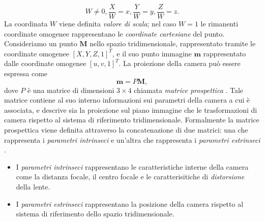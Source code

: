 \[W\neq 0,
\frac{X}{W}=x,
\frac{Y}{W}=y,
\frac{Z}{W}=z.\]
La coordinata $W$ viene definita \textit{valore di scala}; nel caso $W=1$ le rimanenti coordinate omogenee rappresentano le \textit{coordinate cartesiane} del punto.\\
Consideriamo un punto $\textbf{M}$ nello spazio tridimensionale, rappresentato tramite le coordinate omogenee $[X,Y,Z,1]^\textit{T}$, e il suo punto immagine $\textbf{m}$ rappresentato dalle coordinate omogenee $[u,v,1]^\textit{T}$.
La proiezione della camera pu\`o essere espressa come
\begin{equation}
\label{eq:proiezione}
\textbf{m}=P\textbf{M},
\end{equation}
dove $P$  \`e una matrice di dimensioni $3 \times 4$ chiamata \textit{matrice prospettica} \cite{hartley2003multiple}.
Tale matrice contiene al suo interno informazioni sui parametri della camera a cui \`e associata, e descrive sia la proiezione sul piano immagine che le trasformazioni di camera rispetto al sistema di riferimento tridimensionale.
Formalmente la matrice prospettica viene definita attraverso la concatenazione di due matrici: una che rappresenta i \textit{parametri intrinseci} e un'altra che rappresenta i \textit{parametri estrinseci} \cite{forsyth2002computer}.
\begin{itemize}
	\item I \textit{parametri intrinseci} rappresentano le caratteristiche interne della camera come la distanza focale, il centro focale e le caratterisitiche di \textit{distorsione} della lente.
	\item I \textit{parametri estrinseci} rappresentano la posizione della camera rispetto al sistema di riferimento dello spazio tridimensionale.
\end{itemize} 
